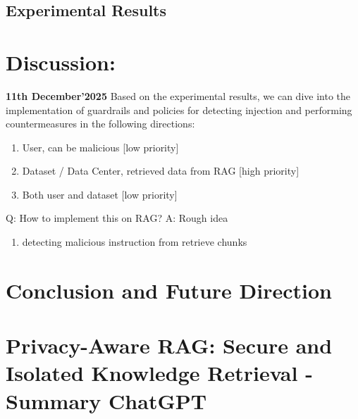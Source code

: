 \documentclass[conference, anonymous]{IEEEtran}
\begin{document}
\subsection{Experimental Results}

\section{Discussion:}
\textbf{11th December'2025} \newline 
Based on the experimental results, we can dive into the implementation of guardrails and policies for detecting injection and performing countermeasures in the following directions:
\begin{enumerate}
    \item User, can be malicious [low priority]
    \item Dataset / Data Center, retrieved data from RAG [high priority]
    \item Both user and dataset [low priority]
\end{enumerate}
Q: How to implement this on RAG? \newline
A: Rough idea
\begin{enumerate}
    \item detecting malicious instruction from retrieve chunks
\end{enumerate}


\section{Conclusion and Future Direction}
\label{sec: conclusion}







\section{Privacy-Aware RAG: Secure and Isolated Knowledge Retrieval - Summary ChatGPT}
\end{document}
